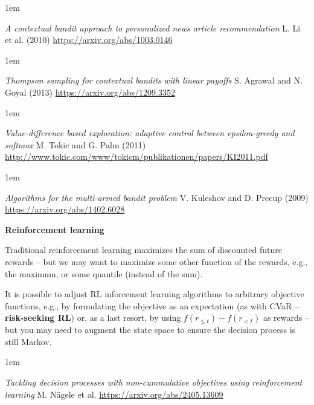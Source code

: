 \documentclass[a5paper]{article}
\let\d\textbf
\let\leq\leqslant
\newenvironment{reference}{%
  \medskip\goodbreak
  \parskip 0pt
  \raggedright
  \leftskip 1em
  \obeylines
}{\par\medskip\goodbreak}
\def\section#1{\clearpage{\vspace*{0cm}\LARGE\centering\bfseries #1\par\bigskip\bigskip}}
\def\subsection#1{{\par\bigskip\goodbreak\large\bfseries #1\par}}
\begin{document}
\begin{reference}
  \emph{A contextual bandit approach to personalized news article recommendation}
  L. Li et al. (2010)
  \url{https://arxiv.org/abs/1003.0146}
\end{reference}

\begin{reference}
  \emph{Thompson sampling for contextual bandits with linear payoffs}
  S. Agrawal and N. Goyal (2013)
  \url{https://arxiv.org/abs/1209.3352}
\end{reference}

\begin{reference}
  \emph{Value-difference based exploration: adaptive control between epsilon-greedy and softmax}
  M. Tokic and G. Palm (2011)
  \url{http://www.tokic.com/www/tokicm/publikationen/papers/KI2011.pdf}
\end{reference}

\begin{reference}
  \emph{Algorithms for the multi-armed bandit problem}
  V. Kuleshov and D. Precup (2009)
  \url{https://arxiv.org/abs/1402.6028}
\end{reference}

\subsection{Reinforcement learning}

Traditional reinforcement learning maximizes the sum of discounted future rewards --
but we may want to maximize some other function of the rewards, e.g.,
the maximum, or some quantile (instead of the sum).

It is possible to adjust RL inforcement learning algorithms to
arbitrary objective functions, e.g., by formulating the objective as an expectation
(as with CVaR -- \d{risk-seeking RL}) or,
as a last resort, by using
$ f( r_{ \leq t } ) - f( r_{ < t } ) $
as rewards -- but you may need to augment the state space to ensure the decision process is still Markov.

\begin{reference}
  \emph{Tackling decision processes with non-cummulative objectives using reinforcement learning}
  M. Nägele et al.
  \url{https://arxiv.org/abs/2405.13609}
\end{reference}
  
\section{Large Language Models}
\end{document}
